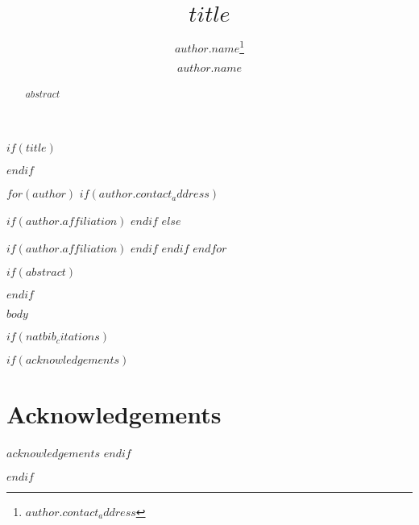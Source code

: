 \documentclass[$CL_style$]{clv3}
\begin{document}
$if(title)$
  \title{$title$}
$endif$

$for(author)$
  $if(author.contact_address)$
    \author{$author.name$\thanks{$author.contact_address$}}
    $if(author.affiliation)$
    $endif$
  $else$
    \author{$author.name$}
    $if(author.affiliation)$
    $endif$
  $endif$
$endfor$

\maketitle

$if(abstract)$
\begin{abstract}
$abstract$
\end{abstract}
$endif$

$body$

$if(natbib_citations)$
\begin{multicols}{2}

$if(acknowledgements)$
\section*{Acknowledgements}\label{acknowledgements}
$acknowledgements$
$endif$



\end{multicols}
$endif$
\end{document}
